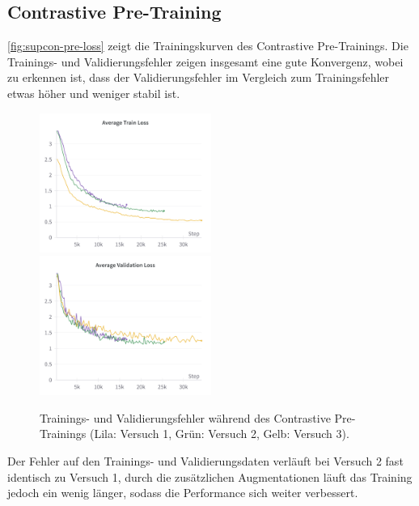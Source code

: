 \subsection{Contrastive Pre-Training} \label{subsec:supcon-pre-results}

\autoref{fig:supcon-pre-loss} zeigt die Trainingskurven des Contrastive Pre-Trainings. Die Trainings- und Validierungsfehler zeigen insgesamt eine gute Konvergenz, wobei zu erkennen ist, dass der Validierungsfehler im Vergleich zum Trainingsfehler etwas höher und weniger stabil ist.

\begin{figure}[h]
	\centering
	\includegraphics[width=0.5\textwidth]{figure_results_supcon-pre_avg-train-loss.png}%
	\includegraphics[width=0.5\textwidth]{figure_results_supcon-pre_avg-val-loss.png}
	\caption[Trainings- und Validierungsfehler während des Contrastive Pre-Trainings.]{Trainings- und Validierungsfehler während des Contrastive Pre-Trainings (\textcolor{exp1}{Lila}: Versuch 1, \textcolor{exp2}{Grün}: Versuch 2, \textcolor{exp3}{Gelb}: Versuch 3).}
	\label{fig:supcon-pre-loss}
\end{figure}

Der Fehler auf den Trainings- und Validierungsdaten verläuft bei Versuch 2 fast identisch zu Versuch 1, durch die zusätzlichen Augmentationen läuft das Training jedoch ein wenig länger, sodass die Performance sich weiter verbessert.


